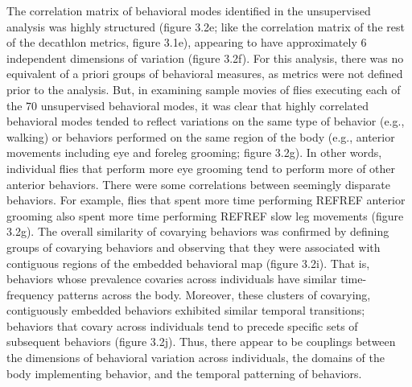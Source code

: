 \documentclass[12pt,letterpaper]{article}
\begin{document}
The correlation matrix of behavioral modes identified in the unsupervised analysis was highly structured (figure 3.2e; like the correlation matrix of the rest of the decathlon metrics, figure 3.1e), appearing to have approximately 6 independent dimensions of variation (figure 3.2f). For this analysis, there was no equivalent of a priori groups of behavioral measures, as metrics were not defined prior to the analysis. But, in examining sample movies of flies executing each of the 70 unsupervised behavioral modes, it was clear that highly correlated behavioral modes tended to reflect variations on the same type of behavior (e.g., walking) or behaviors performed on the same region of the body (e.g., anterior movements including eye and foreleg grooming; figure 3.2g). In other words, individual flies that perform more eye grooming tend to perform more of other anterior behaviors. There were some correlations between seemingly disparate behaviors. For example, flies that spent more time performing REFREF anterior grooming also spent more time performing REFREF slow leg movements (figure 3.2g). The overall similarity of covarying behaviors was confirmed by defining groups of covarying behaviors and observing that they were associated with contiguous regions of the embedded behavioral map (figure 3.2i). That is, behaviors whose prevalence covaries across individuals have similar time-frequency patterns across the body. Moreover, these clusters of covarying, contiguously embedded behaviors exhibited similar temporal transitions; behaviors that covary across individuals tend to precede specific sets of subsequent behaviors (figure 3.2j). Thus, there appear to be couplings between the dimensions of behavioral variation across individuals, the domains of the body implementing behavior, and the temporal patterning of behaviors. 
\end{document}
